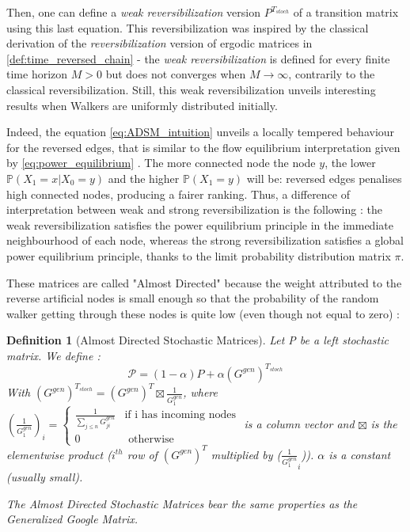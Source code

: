 \documentclass[sn-mathphys]{sn-jnl}%
\theoremstyle{thmstyleone}%
\theoremstyle{thmstyletwo}%
\theoremstyle{thmstylethree}%
\newtheorem{definition}[theo]{Definition}
\begin{document}
Then, one can define a \textit{weak reversibilization} version
$P^{T_{stoch}}$ of a transition matrix using this last equation. This
reversibilization was inspired by the classical derivation of the
\textit{reversibilization} version of ergodic matrices in
\ref{def:time_reversed_chain} - the \textit{weak reversibilization} is
defined for every finite time horizon $M>0$ but does not converges
when $M\rightarrow \infty$, contrarily to the classical
reversibilization. Still, this weak reversibilization unveils
interesting results when Walkers are uniformly distributed
initially.

Indeed, the equation \ref{eq:ADSM_intuition} unveils a locally
tempered behaviour for the reversed edges, that is similar to the flow
equilibrium interpretation given by \ref{eq:power_equilibrium} . The
more connected node the node $y$, the lower $\mathbb{P}(X_1=x|X_0=y)$
and the higher $\mathbb{P}(X_1=y)$ will be: reversed edges penalises
high connected nodes, producing a fairer ranking.  Thus, a difference
of interpretation between weak and strong reversibilization is the
following : the weak reversibilization satisfies the power equilibrium
principle in the immediate neighbourhood of each node, whereas the
strong reversibilization satisfies a global power equilibrium
principle, thanks to the limit probability distribution matrix $\pi$.

These matrices are called "Almost Directed" because the weight
attributed to the reverse artificial nodes is small enough so that the
probability of the random walker getting through these nodes is quite
low (even though not equal to zero) :

\begin{definition}[Almost Directed Stochastic Matrices]\label{def:ADSM1}
Let P be a left stochastic matrix. We define :
\begin{equation}
    \mathcal{P} = (1-\alpha) P + \alpha (G^{gen})^{T_{stoch}}
\end{equation}
With $(G^{gen})^{T_{stoch}} = (G^{gen})^{T} \boxtimes \frac{1}{G^{gen}_1}$, where $(\frac{1}{G^{gen}_1})_i = \left\{
    \begin{array}{ll}
        \frac{1}{\sum_{j\leq n} G^{gen}_{ji}} & \mbox{if i has incoming nodes} \\
        0 & \mbox{ otherwise}
\end{array} \right.$ is a column vector and $\boxtimes$ is the elementwise product ($i^{th}$ row of $(G^{gen})^{T}$ multiplied by ($\frac{1}{G^{gen}_1}_i$)). $\alpha$ is a constant (usually small).

The \textit{Almost Directed Stochastic Matrices} bear the same properties as the \textit{Generalized Google Matrix}.

\end{definition}
\end{document}
